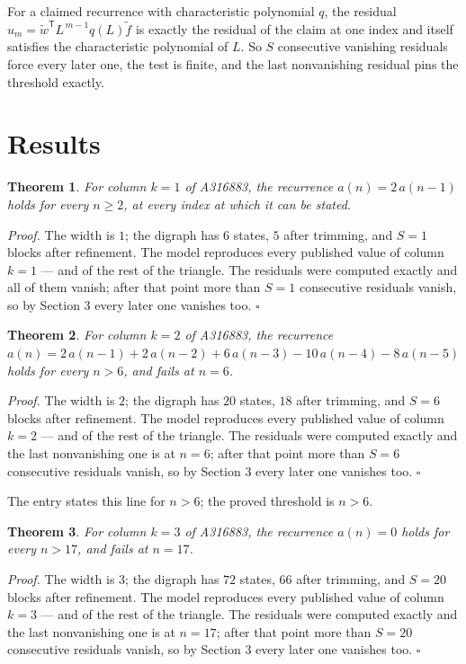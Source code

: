 \documentclass[11pt]{article}
\newtheorem{theorem}{Theorem}
\theoremstyle{definition}
\begin{document}
For a claimed recurrence with characteristic polynomial $q$, the residual $u_m = \tilde w^{\mathsf T}L^{\,m-1}q(L)\tilde f$ is exactly the residual of the claim at one index and itself satisfies the characteristic polynomial of $L$. So $S$ consecutive vanishing residuals force every later one, the test is finite, and the last nonvanishing residual pins the threshold exactly.

\section{Results}

\begin{theorem} For column $k = 1$ of A316883, the recurrence $a(n) = 2\,a(n-1)$ holds for every $n \ge 2$, at every index at which it can be stated.\end{theorem}

{\itshape Proof.} The width is $1$; the digraph has $6$ states, $5$ after trimming, and $S = 1$ blocks after refinement. The model reproduces every published value of column $k = 1$ --- and of the rest of the triangle. The residuals were computed exactly and all of them vanish; after that point more than $S = 1$ consecutive residuals vanish, so by Section 3 every later one vanishes too. $\square$

\begin{theorem} For column $k = 2$ of A316883, the recurrence $a(n) = 2\,a(n-1) + 2\,a(n-2) + 6\,a(n-3) - 10\,a(n-4) - 8\,a(n-5)$ holds for every $n > 6$, and fails at $n = 6$.\end{theorem}

{\itshape Proof.} The width is $2$; the digraph has $20$ states, $18$ after trimming, and $S = 6$ blocks after refinement. The model reproduces every published value of column $k = 2$ --- and of the rest of the triangle. The residuals were computed exactly and the last nonvanishing one is at $n = 6$; after that point more than $S = 6$ consecutive residuals vanish, so by Section 3 every later one vanishes too. $\square$

The entry states this line for $n > 6$; the proved threshold is $n > 6$.

\begin{theorem} For column $k = 3$ of A316883, the recurrence $a(n) = 0$ holds for every $n > 17$, and fails at $n = 17$.\end{theorem}

{\itshape Proof.} The width is $3$; the digraph has $72$ states, $66$ after trimming, and $S = 20$ blocks after refinement. The model reproduces every published value of column $k = 3$ --- and of the rest of the triangle. The residuals were computed exactly and the last nonvanishing one is at $n = 17$; after that point more than $S = 20$ consecutive residuals vanish, so by Section 3 every later one vanishes too. $\square$
\end{document}

